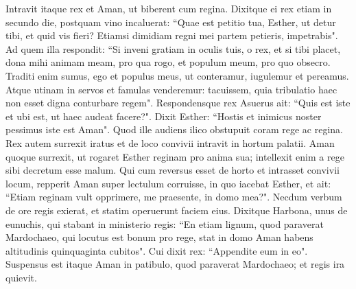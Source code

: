 \begin{biblechapter} 
\verse Intravit itaque rex et Aman, ut biberent cum regina. 
\verse Dixitque ei rex etiam in secundo die, postquam vino incaluerat: “Quae est petitio tua, Esther, ut detur tibi, et quid vis fieri? Etiamsi dimidiam regni mei partem petieris, impetrabis". 
\verse Ad quem illa respondit: “Si inveni gratiam in oculis tuis, o rex, et si tibi placet, dona mihi animam meam, pro qua rogo, et populum meum, pro quo obsecro. 
\verse Traditi enim sumus, ego et populus meus, ut conteramur, iugulemur et pereamus. Atque utinam in servos et famulas venderemur: tacuissem, quia tribulatio haec non esset digna conturbare regem". 
\verse Respondensque rex Asuerus ait: “Quis est iste et ubi est, ut haec audeat facere?". 
\verse Dixit Esther: “Hostis et inimicus noster pessimus iste est Aman". Quod ille audiens ilico obstupuit coram rege ac regina. 
\verse Rex autem surrexit iratus et de loco convivii intravit in hortum palatii. Aman quoque surrexit, ut rogaret Esther reginam pro anima sua; intellexit enim a rege sibi decretum esse malum. 
\verse Qui cum reversus esset de horto et intrasset convivii locum, repperit Aman super lectulum corruisse, in quo iacebat Esther, et ait: “Etiam reginam vult opprimere, me praesente, in domo mea?". Necdum verbum de ore regis exierat, et statim operuerunt faciem eius. 
\verse Dixitque Harbona, unus de eunuchis, qui stabant in ministerio regis: “En etiam lignum, quod paraverat Mardochaeo, qui locutus est bonum pro rege, stat in domo Aman habens altitudinis quinquaginta cubitos". Cui dixit rex: “Appendite eum in eo". 
\verse Suspensus est itaque Aman in patibulo, quod paraverat Mardochaeo; et regis ira quievit. 
\end{biblechapter}

